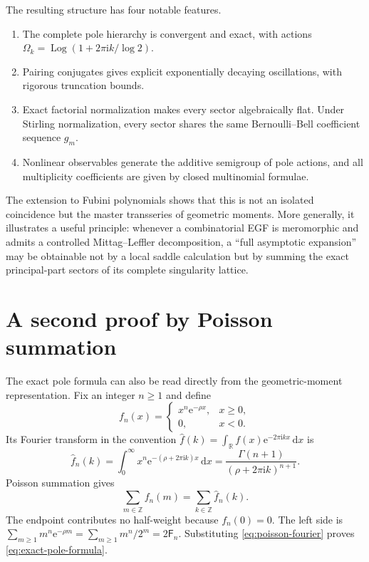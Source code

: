 \documentclass[11pt,oneside]{article}
\numberwithin{equation}{section}
\newcommand{\e}{\mathrm e}
\newcommand{\ii}{\mathrm i}
\newcommand{\dd}{\,\mathrm d}
\newcommand{\Z}{\mathbb Z}
\newcommand{\R}{\mathbb R}
\newcommand{\Fub}{\mathsf F}
\newcommand{\Log}{\operatorname{Log}}
\begin{document}
The resulting structure has four notable features.
\begin{enumerate}
 \item The complete pole hierarchy is convergent and exact, with actions
 \(\Omega_k=\Log(1+2\pi\ii k/\log2)\).
 \item Pairing conjugates gives explicit exponentially decaying oscillations, with rigorous truncation bounds.
 \item Exact factorial normalization makes every sector algebraically flat.  Under Stirling normalization, every sector shares the same Bernoulli--Bell coefficient sequence \(g_m\).
 \item Nonlinear observables generate the additive semigroup of pole actions, and all multiplicity coefficients are given by closed multinomial formulae.
\end{enumerate}

The extension to Fubini polynomials shows that this is not an isolated coincidence but the master transseries of geometric moments.  More generally, it illustrates a useful principle: whenever a combinatorial EGF is meromorphic and admits a controlled Mittag--Leffler decomposition, a ``full asymptotic expansion'' may be obtainable not by a local saddle calculation but by summing the exact principal-part sectors of its complete singularity lattice.

\appendix

\section{A second proof by Poisson summation}
\label{app:poisson}

The exact pole formula can also be read directly from the geometric-moment representation.  Fix an integer \(n\ge1\) and define
\begin{equation}
 f_n(x)=
 \begin{cases}
 x^n\e^{-\rho x},&x\ge0,\\
 0,&x<0.
 \end{cases}
 \label{eq:poisson-function}
\end{equation}
Its Fourier transform in the convention
\(\widehat f(k)=\int_{\R}f(x)\e^{-2\pi\ii kx}\dd x\) is
\begin{equation}
 \widehat f_n(k)
 =\int_0^\infty x^n\e^{-(\rho+2\pi\ii k)x}\dd x
 =\frac{\Gamma(n+1)}{(\rho+2\pi\ii k)^{n+1}}.
 \label{eq:poisson-fourier}
\end{equation}
Poisson summation gives
\begin{equation}
 \sum_{m\in\Z}f_n(m)=\sum_{k\in\Z}\widehat f_n(k).
 \label{eq:poisson-summation}
\end{equation}
The endpoint contributes no half-weight because \(f_n(0)=0\).  The left side is
\(\sum_{m\ge1}m^n\e^{-\rho m}=\sum_{m\ge1}m^n/2^m=2\Fub_n\).  Substituting \cref{eq:poisson-fourier} proves \cref{eq:exact-pole-formula}.
\end{document}
